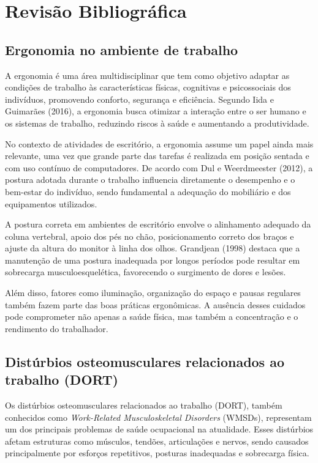 \section{Revisão Bibliográfica}
\label{sec:revisao}

\subsection{Ergonomia no ambiente de trabalho}

A ergonomia é uma área multidisciplinar que tem como objetivo adaptar as condições
de trabalho às características físicas, cognitivas e psicossociais dos indivíduos,
promovendo conforto, segurança e eficiência. Segundo Iida e Guimarães (2016), a
ergonomia busca otimizar a interação entre o ser humano e os sistemas de trabalho,
reduzindo riscos à saúde e aumentando a produtividade.

No contexto de atividades de escritório, a ergonomia assume um papel ainda mais
relevante, uma vez que grande parte das tarefas é realizada em posição sentada e com
uso contínuo de computadores. De acordo com Dul e Weerdmeester (2012), a postura
adotada durante o trabalho influencia diretamente o desempenho e o bem-estar do
indivíduo, sendo fundamental a adequação do mobiliário e dos equipamentos utilizados.

A postura correta em ambientes de escritório envolve o alinhamento adequado da
coluna vertebral, apoio dos pés no chão, posicionamento correto dos braços e ajuste
da altura do monitor à linha dos olhos. Grandjean (1998) destaca que a manutenção de
uma postura inadequada por longos períodos pode resultar em sobrecarga
musculoesquelética, favorecendo o surgimento de dores e lesões.

Além disso, fatores como iluminação, organização do espaço e pausas regulares também
fazem parte das boas práticas ergonômicas. A ausência desses cuidados pode
comprometer não apenas a saúde física, mas também a concentração e o rendimento do
trabalhador.

\subsection{Distúrbios osteomusculares relacionados ao trabalho (DORT)}

Os distúrbios osteomusculares relacionados ao trabalho (DORT), também conhecidos
como \emph{Work-Related Musculoskeletal Disorders} (WMSDs), representam um dos
principais problemas de saúde ocupacional na atualidade. Esses distúrbios afetam
estruturas como músculos, tendões, articulações e nervos, sendo causados
principalmente por esforços repetitivos, posturas inadequadas e sobrecarga física.

